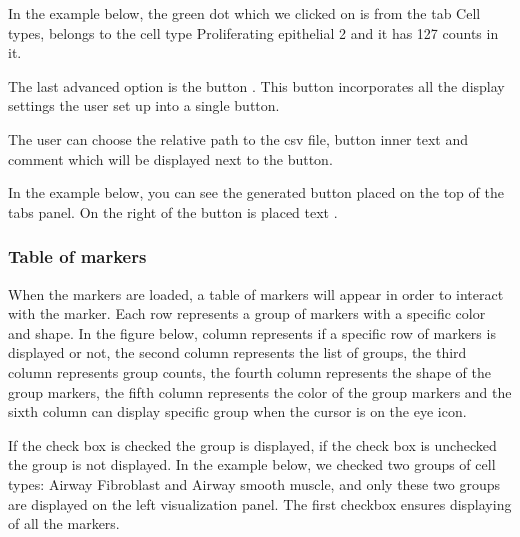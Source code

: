 \documentclass[letterpaper,10pt,english,openany,oneside]{sphinxmanual}
\begin{document}
\sphinxAtStartPar
{}

\sphinxAtStartPar
In the example below, the green dot which we clicked on is from the tab Cell types, belongs to the cell type Proliferating epithelial 2 and it has 127 counts in it.

\sphinxAtStartPar
{}

\sphinxAtStartPar
The last advanced option is the button . This button incorporates all the display settings the user set up into a single button.

\sphinxAtStartPar
{}

\sphinxAtStartPar
The user can choose the relative path to the csv file, button inner text and comment which will be displayed next to the button.

\sphinxAtStartPar
{}

\sphinxAtStartPar
In the example below, you can see the generated button  placed on the top of the tabs panel. On the right of the button is placed text .

\sphinxAtStartPar
{}


\subsubsection{Table of markers}
\label{\detokenize{docs/starting/markers:table-of-markers}}
\sphinxAtStartPar
When the markers are loaded, a table of markers will appear in order to interact with the marker. Each row represents a group of markers with a specific color and shape. In the figure below, column  represents if a specific row of markers is displayed or not, the second column  represents the list of groups, the third column  represents group counts, the fourth column  represents the shape of the group markers, the fifth column  represents the color of the group markers and the sixth column  can display specific group when the cursor is on the eye icon.

\sphinxAtStartPar
{}

\sphinxAtStartPar
If the check box is checked \sphinxhyphen{} the group is displayed, if the check box is unchecked \sphinxhyphen{} the group is not displayed. In the example below, we checked two groups of cell types: Airway Fibroblast and Airway smooth muscle, and only these two groups are displayed on the left visualization panel. The first checkbox  ensures displaying of all the markers.
\end{document}
